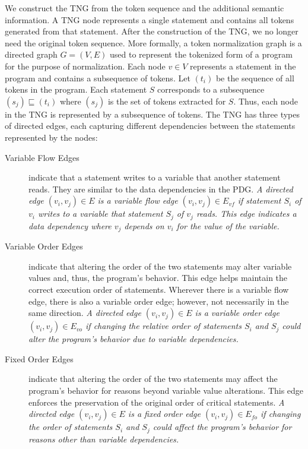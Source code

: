 We construct the TNG from the token sequence and the additional semantic information.
A TNG node represents a single statement and contains all tokens generated from that statement.
After the construction of the TNG, we no longer need the original token sequence.
%
More formally, a token normalization graph is a directed graph \( G = (V, E) \) used to represent the tokenized form of a program for the purpose of normalization. Each node \( v \in V \) represents a statement in the program and contains a subsequence of tokens. Let \( (t_i) \) be the sequence of all tokens in the program. Each statement \( S \) corresponds to a subsequence \( (s_j) \sqsubseteq (t_i) \) where \( (s_j) \) is the set of tokens extracted for \( S \). Thus, each node in the TNG is represented by a subsequence of tokens.
%
The TNG has three types of directed edges, each capturing different dependencies between the statements represented by the nodes:
\begin{description}
    \item[Variable Flow Edges] indicate that a statement writes to a variable that another statement reads. They are similar to the data dependencies in the PDG.
    \textit{A directed edge \( (v_i, v_j) \in E \) is a variable flow edge $(v_i, v_j) \in E_{vf}$ if statement \( S_i \) of $v_i$ writes to a variable that statement \( S_j \) of $v_j$  reads. This edge indicates a data dependency where \( v_j \) depends on \( v_i \) for the value of the variable.}
    
    \item[Variable Order Edges] indicate that altering the order of the two statements may alter variable values and, thus, the program's behavior.
    This edge helps maintain the correct execution order of statements.
    Wherever there is a variable flow edge, there is also a variable order edge; however, not necessarily in the same direction.
     \textit{A directed edge \( (v_i, v_j) \in E \) is a variable order edge $(v_i, v_j) \in E_{vo}$ if changing the relative order of statements \( S_i \) and \( S_j \) could alter the program's behavior due to variable dependencies.}
     
    \item[Fixed Order Edges] indicate that altering the order of the two statements may affect the program's behavior for reasons beyond variable value alterations.
    This edge enforces the preservation of the original order of critical statements.
    \textit{A directed edge \( (v_i, v_j) \in E \) is a fixed order edge $(v_i, v_j) \in E_{fo}$ if changing the order of statements \( S_i \) and \( S_j \) could affect the program's behavior for reasons other than variable dependencies.}   
\end{description}

